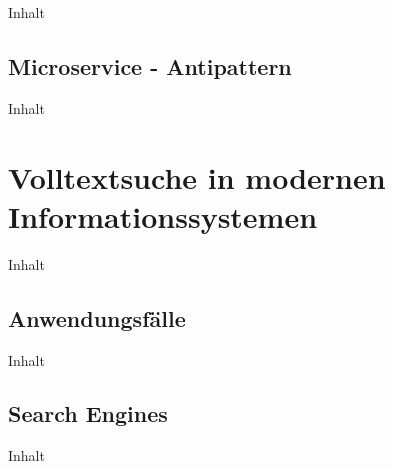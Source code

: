 Inhalt

\subsection{Microservice - Antipattern\label{subsec2.2.2:Unterunterpunkt-2}}

Inhalt

\section{Volltextsuche in modernen Informationssystemen\label{sec2.3:Unterpunkt-3}}

Inhalt

\subsection{Anwendungsfälle\label{subsec2.3.1:Unterunterpunkt-1}}

Inhalt

\subsection{Search Engines\label{subsec2.3.2:Unterunterpunkt-2}}

Inhalt